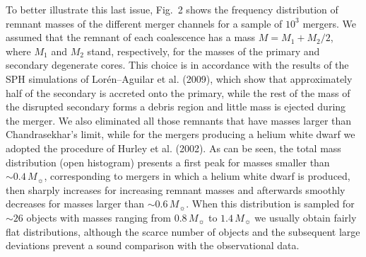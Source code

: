 \documentclass[]{emulateapj}
\begin{document}
To  better illustrate  this  last issue,  Fig.~2  shows the  frequency
distribution of remnant masses of  the different merger channels for a
sample  of  $10^3$ mergers.   We  assumed  that  the remnant  of  each
coalescence  has a mass  $M=M_1+M_2/2$, where  $M_1$ and  $M_2$ stand,
respectively, for  the masses of the primary  and secondary degenerate
cores.   This choice  is in  accordance with  the results  of  the SPH
simulations  of  Lor\'en--Aguilar  et  al.  (2009),  which  show  that
approximately  half of  the secondary  is accreted  onto  the primary,
while the rest  of the mass of the disrupted  secondary forms a debris
region  and  little  mass  is  ejected during  the  merger.   We  also
eliminated   all  those   remnants  that   have  masses   larger  than
Chandrasekhar's limit, while for  the mergers producing a helium white
dwarf we  adopted the procedure of  Hurley et al.  (2002).   As can be
seen, the  total mass distribution  (open histogram) presents  a first
peak for  masses smaller than $\sim 0.4\,  M_{\sun}$, corresponding to
mergers  in which  a  helium  white dwarf  is  produced, then  sharply
increases  for  increasing  remnant  masses  and  afterwards  smoothly
decreases  for masses larger  than $\sim  0.6\, M_{\sun}$.   When this
distribution is sampled for $\sim 26$ objects with masses ranging from
$0.8\,  M_{\sun}$ to $1.4\,  M_{\sun}$ we  usually obtain  fairly flat
distributions,  although   the  scarce  number  of   objects  and  the
subsequent  large  deviations  prevent  a sound  comparison  with  the
observational data.
\end{document}
